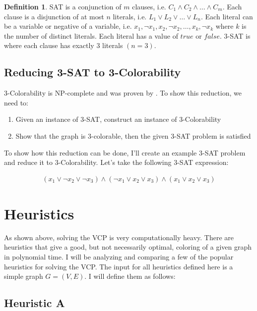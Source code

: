 \documentclass{article}
\theoremstyle{definition}
\newtheorem*{definition}{Definition}
\begin{document}
\begin{definition}
SAT is a conjunction of $m$ clauses, i.e. $C_1 \wedge C_2 \wedge \dots \wedge C_m$. Each clause is a disjunction of at most $n$ literals, i.e. $L_1 \vee L_2 \vee \dots \vee L_n$. Each literal can be a variable or negative of a variable, i.e. $x_1, \neg x_1, x_2, \neg x_2, \dots , x_k, \neg x_k$ where $k$ is the number of distinct literals. Each literal has a value of $true$ or $false$. 3-SAT is where each clause has exactly 3 literals \((n = 3)\).
\end{definition}

\subsection*{Reducing 3-SAT to 3-Colorability}
3-Colorability is NP-complete and was proven by \cite{moret}. To show this reduction, we need to:

\begin{enumerate}
\item Given an instance of 3-SAT, construct an instance of 3-Colorability
\item Show that the graph is 3-colorable, then the given 3-SAT problem is satisfied
\end{enumerate}

To show how this reduction can be done, I'll create an example 3-SAT problem and reduce it to 3-Colorability. Let's take the following 3-SAT expression:

\begin{align*}
\left( x_1 \vee \neg x_2 \vee \neg x_3 \right) \wedge \left( \neg x_1 \vee x_2 \vee x_3 \right) \wedge \left( x_1 \vee x_2 \vee x_3 \right)
\end{align*}


\section*{Heuristics}
As shown above, solving the VCP is very computationally heavy. There are heuristics that give a good, but not necessarily optimal, coloring of a given graph in polynomial time. I will be analyzing and comparing a few of the popular heuristics for solving the VCP. The input for all heuristics defined here is a simple graph \(G = (V, E)\). I will define them as follows:

\subsection*{Heuristic A}
\end{document}
